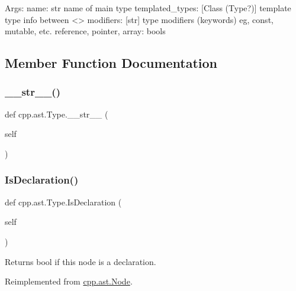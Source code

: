 \begin{DoxyVerb}Args:
  name: str name of main type
  templated_types: [Class (Type?)] template type info between <>
  modifiers: [str] type modifiers (keywords) eg, const, mutable, etc.
  reference, pointer, array: bools
\end{DoxyVerb}
 

\subsection{Member Function Documentation}
\mbox{\label{classcpp_1_1ast_1_1_type_a1a10eff21f6150b7e14bde3788fa069b}} 
\subsubsection{\texorpdfstring{\_\_str\_\_()}{\_\_str\_\_()}}
{\footnotesize\ttfamily def cpp.\+ast.\+Type.\+\_\+\+\_\+str\+\_\+\+\_\+ (\begin{DoxyParamCaption}\item[{}]{self }\end{DoxyParamCaption})}

\mbox{\label{classcpp_1_1ast_1_1_type_a590071a2bce7ea5140d7eb86c90f63bf}} 
\subsubsection{\texorpdfstring{IsDeclaration()}{IsDeclaration()}}
{\footnotesize\ttfamily def cpp.\+ast.\+Type.\+Is\+Declaration (\begin{DoxyParamCaption}\item[{}]{self }\end{DoxyParamCaption})}

\begin{DoxyVerb}Returns bool if this node is a declaration.\end{DoxyVerb}
 

Reimplemented from \mbox{\hyperlink{classcpp_1_1ast_1_1_node_ab3eca703a79fb65bc25dfbcb7547c79e}{cpp.\+ast.\+Node}}.

\mbox{\label{classcpp_1_1ast_1_1_type_aedff25dc3736e83388742e55fe29159b}} 

